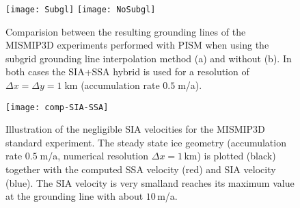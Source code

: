 \begin{figure}[ht]
\centering
\texttt{[image: Subgl]}
\texttt{[image: NoSubgl]}
\caption{Comparision between the resulting grounding lines of the MISMIP3D experiments performed with PISM when using the subgrid grounding line interpolation method (a) and without (b). In both cases the SIA+SSA hybrid is used for a resolution of $\Delta x = \Delta y = 1\;$km (accumulation rate $0.5\;$m/a).}
\label{fig:Subgl}
\end{figure}

\begin{figure}[ht]
\centering
\texttt{[image: comp-SIA-SSA]}
\caption{Illustration of the negligible SIA velocities for the MISMIP3D standard experiment. The steady state ice geometry (accumulation rate $0.5\;$m/a, numerical resolution $\Delta x = 1\,$km) is plotted (black) together with the computed SSA velocity (red) and SIA velocity (blue). The SIA velocity is very smalland reaches its maximum value at the grounding line with about $10\,$m/a.}
\label{fig:compSIASSA}
\end{figure}

